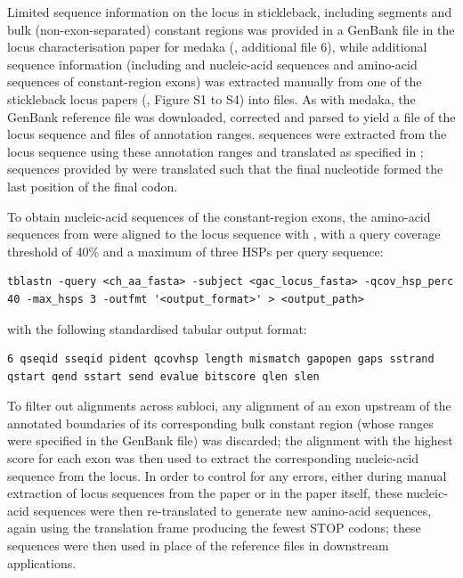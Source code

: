 Limited sequence information on the \igh{} locus in stickleback, including \vh segments and bulk (non-exon-separated) constant regions was provided in a GenBank file in the locus characterisation paper for medaka (\parencite{magadan2011medaka}, additional file 6), while additional sequence information (including \dh and \jh nucleic-acid sequences and amino-acid sequences of constant-region exons) was extracted manually from one of the stickleback locus papers (\parencite{bao2010stickleback},  Figure S1 to S4) into  files. As with medaka, the GenBank reference file was downloaded, corrected and parsed to yield a  file of the locus sequence and  files of annotation ranges. \vh sequences were extracted from the locus sequence using these annotation ranges and translated as specified in ; \jh sequences provided by \parencite{bao2010stickleback} were translated such that the final nucleotide formed the last position of the final codon.

To obtain nucleic-acid sequences of the constant-region exons, the amino-acid sequences from \parencite{bao2010stickleback} were aligned to the locus sequence with  \parencite{gertz2006tblastn}, with a query coverage threshold of 40\% and a maximum of three HSPs per query sequence:

\begin{lstlisting}
tblastn -query <ch_aa_fasta> -subject <gac_locus_fasta> -qcov_hsp_perc 40 -max_hsps 3 -outfmt '<output_format>' > <output_path>
\end{lstlisting}

\noindent with the following standardised tabular output format: 

\begin{lstlisting}
6 qseqid sseqid pident qcovhsp length mismatch gapopen gaps sstrand qstart qend sstart send evalue bitscore qlen slen
\end{lstlisting}

To filter out alignments across subloci, any alignment of an exon upstream of the annotated boundaries of its corresponding bulk constant region (whose ranges were specified in the GenBank file) was discarded; the alignment with the highest score for each exon was then used to extract the corresponding nucleic-acid sequence from the locus. In order to control for any errors, either during manual extraction of locus sequences from the paper or in the paper itself, these nucleic-acid sequences were then re-translated to generate new amino-acid sequences, again using the translation frame producing the fewest STOP codons; these sequences were then used in place of the reference files in downstream applications.

